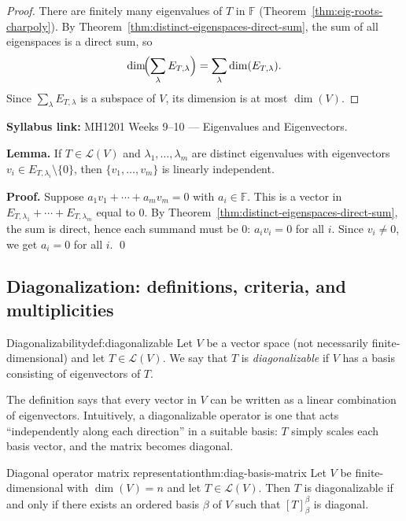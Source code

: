 \begin{proof}
There are finitely many eigenvalues of $T$ in $\mathbb{F}$ (Theorem~\ref{thm:eig-roots-charpoly}).
By Theorem~\ref{thm:distinct-eigenspaces-direct-sum}, the sum of all eigenspaces is a direct sum, so
\[
\dim\!\Bigl(\sum_{\lambda}E_{T,\lambda}\Bigr)=\sum_{\lambda}\dim(E_{T,\lambda}).
\]
Since $\sum_{\lambda}E_{T,\lambda}$ is a subspace of $V$, its dimension is at most $\dim(V)$.
\end{proof}

\begin{extension}[title={Extension (Beyond Syllabus: Distinct eigenvalues $\Rightarrow$ independent eigenvectors)}]
\textbf{Syllabus link:} MH1201 Weeks 9--10 --- Eigenvalues and Eigenvectors.

\textbf{Lemma.} If $T\in\mathcal{L}(V)$ and $\lambda_1,\dots,\lambda_m$ are distinct eigenvalues with eigenvectors
$v_i\in E_{T,\lambda_i}\setminus\{0\}$, then $\{v_1,\dots,v_m\}$ is linearly independent.

\textbf{Proof.} Suppose $a_1v_1+\cdots+a_mv_m=0$ with $a_i\in\mathbb{F}$.
This is a vector in $E_{T,\lambda_1}+\cdots+E_{T,\lambda_m}$ equal to $0$.
By Theorem~\ref{thm:distinct-eigenspaces-direct-sum}, the sum is direct, hence each summand must be $0$:
$a_iv_i=0$ for all $i$. Since $v_i\neq 0$, we get $a_i=0$ for all $i$. \qed
\end{extension}

\subsection{Diagonalization: definitions, criteria, and multiplicities}

\begin{definition}{Diagonalizability}{def:diagonalizable}
Let $V$ be a vector space (not necessarily finite-dimensional) and let $T\in\mathcal{L}(V)$.
We say that $T$ is \emph{diagonalizable} if $V$ has a basis consisting of eigenvectors of $T$.
\end{definition}

The definition says that every vector in $V$ can be written as a linear combination of eigenvectors.
Intuitively, a diagonalizable operator is one that acts ``independently along each direction'' in a suitable basis:
$T$ simply scales each basis vector, and the matrix becomes diagonal.

\begin{theorem}{Diagonal operator matrix representation}{thm:diag-basis-matrix}
Let $V$ be finite-dimensional with $\dim(V)=n$ and let $T\in\mathcal{L}(V)$.
Then $T$ is diagonalizable if and only if there exists an ordered basis $\beta$ of $V$ such that $[T]_{\beta}^{\beta}$ is diagonal.
\end{theorem}

